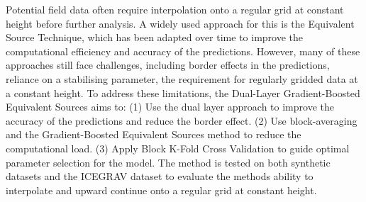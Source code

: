 Potential field data often require interpolation onto a regular grid at constant height before further analysis. A widely used approach for this is the Equivalent Source Technique, which has been adapted over time to improve the computational efficiency and accuracy of the predictions. However, many of these approaches still face challenges, including border effects in the predictions, reliance on a stabilising parameter, the requirement for regularly gridded data at a constant height. To address these limitations, the Dual-Layer Gradient-Boosted Equivalent Sources aims to: (1) Use the dual layer approach to improve the accuracy of the predictions and reduce the border effect. (2) Use block-averaging and the Gradient-Boosted Equivalent Sources method to reduce the computational load. (3) Apply Block K-Fold Cross Validation to guide optimal parameter selection for the model. The method is tested on both synthetic datasets and the ICEGRAV dataset to evaluate the methods ability to interpolate and upward continue onto a regular grid at constant height.
